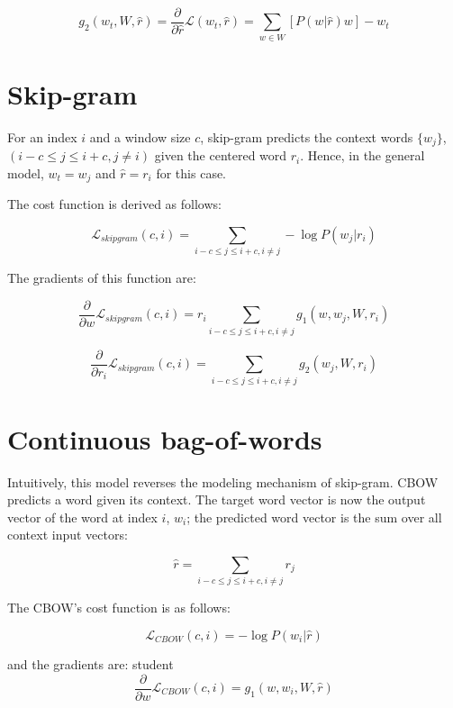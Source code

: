 \documentclass[11pt,letterpaper]{article}
\begin{document}
\begin{equation}
g_2(w_t, W, \hat{r}) = \frac{\partial}{\partial \hat{r}} \mathcal{L}(w_t, \hat{r}) = \sum_{w \in W} [P(w | \hat{r}) w] - w_t
\end{equation}

\section{Skip-gram}

For an index $i$ and a window size $c$, skip-gram predicts the context words $\{w_j \}$, $(i-c \leq j \leq i + c, j \neq i)$ given the centered word $r_i$. Hence, in the general model, $w_t = w_j$ and $\hat{r}  = r_i$ for this case. 

The cost function is derived as follows:

$$ \mathcal{L}_{skipgram} (c, i) = \sum_{i - c \leq j \leq i + c, i \neq j} - \log P(w_j | r_i)$$

The gradients of this function are:

\begin{equation}
 \frac{\partial}{\partial w} \mathcal{L}_{skipgram}(c, i) = r_i \sum_{i - c \leq j \leq i + c, i \neq j}  g_1(w, w_j, W, r_i)
\end{equation}

\begin{equation}
 \frac{\partial}{\partial r_i} \mathcal{L}_{skipgram}(c, i) = \sum_{i - c \leq j \leq i + c, i \neq j}  g_2(w_j, W, r_i)
\end{equation} 

\section{Continuous bag-of-words}

Intuitively, this model reverses the modeling mechanism of skip-gram. CBOW predicts a word given its context. The target word vector is now the output vector of the word at index $i$, $w_i$; the predicted word vector is the sum over all context input vectors:

$$ \hat{r} = \sum_{i - c \leq j \leq i + c, i \neq j} r_j$$ 

The CBOW's cost function  is as follows:

$$ \mathcal{L}_{CBOW   } (c, i) = - \log P(w_i | \hat{r})$$

and the gradients are:
  student
\begin{equation}
 \frac{\partial}{\partial w} \mathcal{L}_{CBOW}(c, i) =  g_1(w, w_i, W, \hat{r})
\end{equation}
\end{document}
